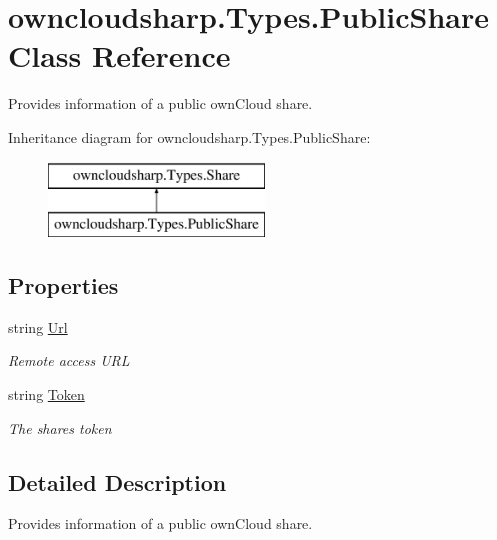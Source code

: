 \hypertarget{classowncloudsharp_1_1_types_1_1_public_share}{}\section{owncloudsharp.\+Types.\+Public\+Share Class Reference}
\label{classowncloudsharp_1_1_types_1_1_public_share}


Provides information of a public own\+Cloud share.  


Inheritance diagram for owncloudsharp.\+Types.\+Public\+Share\+:\begin{figure}[H]
\begin{center}
\leavevmode
\includegraphics[height=2.000000cm]{classowncloudsharp_1_1_types_1_1_public_share}
\end{center}
\end{figure}
\subsection*{Properties}
\begin{DoxyCompactItemize}
\item 
string \hyperlink{classowncloudsharp_1_1_types_1_1_public_share_a25d939622a2d70b31a7885cfc4e9fe73}{Url}
\begin{DoxyCompactList}\small\item\em Remote access U\+RL \end{DoxyCompactList}\item 
string \hyperlink{classowncloudsharp_1_1_types_1_1_public_share_a59e47ec6de51eb32aedba520e5fb5e49}{Token}
\begin{DoxyCompactList}\small\item\em The shares token \end{DoxyCompactList}\end{DoxyCompactItemize}


\subsection{Detailed Description}
Provides information of a public own\+Cloud share. 



